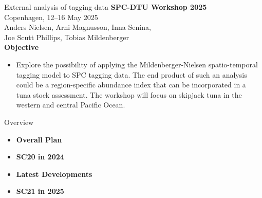 \documentclass[aspectratio=169,fleqn]{beamer}
\begin{document}
\begin{frame}{External analysis of tagging data}
  \textbf{\darkgreen SPC-DTU Workshop 2025}\\[2ex]
  Copenhagen, 12--16 May 2025\\[2ex]
  Anders Nielsen, Arni Magnusson, Inna Senina,\\[0.2ex]
  Joe Scutt Phillips, Tobias Mildenberger\\[3ex]
  \textbf{Objective}\\[1ex]
  \begin{itemize}
    \item[] Explore the possibility of applying the Mildenberger-Nielsen
    spatio-temporal\\
    tagging model to SPC tagging data. The end product of such an analysis\\
    could be a region-specific abundance index that can be incorporated in a\\
    tuna stock assessment. The workshop will focus on skipjack tuna in the\\
    western and central Pacific Ocean.\\[2ex]
  \end{itemize}
\end{frame}


\begin{frame}{Overview}
  \begin{itemize}
    \item[] {\bf\darkblue Overall Plan} \\[5ex]
    \item[] {\bf\darkblue SC20 in 2024} \\[5ex]
    \item[] {\bf\darkblue Latest Developments} \\[5ex]
    \item[] {\bf\darkblue SC21 in 2025} \\[1ex]
  \end{itemize}
\end{frame}
\end{document}
